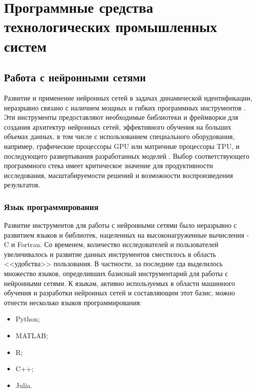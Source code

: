 \chapter{Программные средства технологических промышленных систем}



\section{Работа с нейронными сетями}

Развитие и применение нейронных сетей в задачах
динамической идентификации, неразрывно связано с
наличием мощных и гибких программных инструментов \cite{bib:gui:ml}.
Эти инструменты предоставляют необходимые библиотеки
и фреймворки для создания архитектур нейронных
сетей, эффективного обучения на больших объемах
данных, в том числе с использованием специального
оборудования, например, графические процессоры GPU
или матричные процессоры TPU, и последующего
развертывания разработанных моделей \cite{bib:tools:ml}. Выбор
соответствующего программного стека имеет
критическое значение для продуктивности
исследования, масштабируемости решений и возможности
воспроизведения результатов.

\subsection{Язык программирования}

Развитие инструментов для работы с нейронными сетями было неразрывно с
развитием языков и библиотек, нацеленных на высоконагруженные вычисления - C и
Fortran. Со временем, количество исследователей и пользователей увеличивалось и
развитие данных инструментов сместилось в область <<удобства>> пользования. В
частности, за последние гда выделилось множество языков, определивших базисный
инструментарий для работы с нейронными сетями. К языкам, активно используемых в
области машинного обучения и разработки нейронных сетей и составляющим этот
базис, можно отнести несколько языков программирования:

\begin{itemize}
  \item Python;
  \item MATLAB;
  \item R;
  \item C++;
  \item Julia.
\end{itemize}

